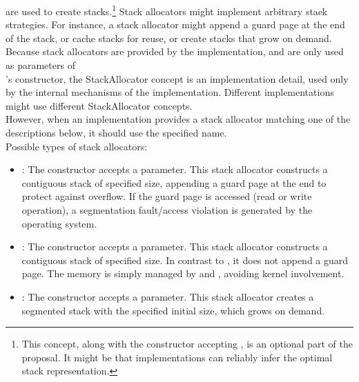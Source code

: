 \label{subsec:stackalloc}
are used to create stacks.\footnote{This concept, along with the \ectx
constructor accepting , is an optional part of the
proposal. It might be that implementations can reliably infer the optimal
stack representation.} Stack allocators might implement arbitrary stack
strategies. For instance, a stack allocator might append a guard page at the
end of the stack, or cache stacks for reuse, or create stacks that grow on
demand.\\
Because stack allocators are provided by the implementation, and are only used
as parameters of\\
\ectx's constructor, the StackAllocator concept is an implementation detail,
used only by the internal mechanisms of the \ectx implementation. Different
implementations might use different StackAllocator concepts.\\
However, when an implementation provides a stack allocator matching one of
the descriptions below, it should use the specified name.\\
Possible types of stack allocators:
\begin{itemize}
    \item {}: The constructor accepts a 
        parameter. This stack allocator constructs a contiguous stack of
        specified size, appending a guard page at the end to protect against
        overflow. If the guard page is accessed (read or write operation), a
        segmentation fault/access violation is generated by the operating
        system.
    \item {}: The constructor accepts a  parameter.
        This stack allocator constructs a contiguous stack of specified size.
        In contrast to , it does not append a guard
        page. The memory is simply managed by 
        and , avoiding kernel involvement.
    \item {}: The constructor accepts a  parameter.
        This stack allocator creates a segmented stack with the specified
        initial size, which grows on demand.
\end{itemize}
